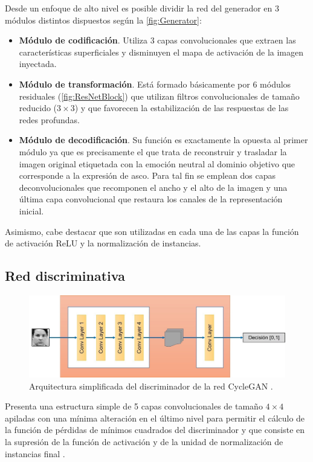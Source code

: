 Desde un enfoque de alto nivel es posible dividir la red del generador en 3 módulos distintos dispuestos según la \autoref{fig:Generator}:
\begin{itemize}
    \item \textbf{Módulo de codificación}. Utiliza 3 capas convolucionales que extraen las características superficiales y disminuyen el mapa de activación de la imagen inyectada.
    \item \textbf{Módulo de transformación}. Está formado básicamente por 6 módulos residuales (\autoref{fig:ResNetBlock}) que utilizan filtros convolucionales de tamaño reducido ($3\times 3$) y que favorecen la estabilización de las respuestas de las redes profundas.
    \item \textbf{Módulo de decodificación}. Su función es exactamente la opuesta al primer módulo ya que es precisamente el que trata de reconstruir y trasladar la imagen original etiquetada con la emoción neutral al dominio objetivo que corresponde a la expresión de asco. Para tal fin se emplean dos capas deconvolucionales que recomponen el ancho y el alto de la imagen y una última capa convolucional que restaura los canales de la representación inicial.
\end{itemize}

Asimismo, cabe destacar que son utilizadas en cada una de las capas la función de activación ReLU y la normalización de instancias.

\subsection{Red discriminativa}

\begin{figure}
  \centering
  \includegraphics[width=\textwidth]{Images/Discriminator.png}
  \caption{Arquitectura simplificada del discriminador de la red CycleGAN \cite{img:CycleGAN}.}
  \label{fig:Discriminator}
\end{figure}

Presenta una estructura simple de 5 capas convolucionales de tamaño $4\times 4$ apiladas con una mínima alteración en el último nivel para permitir el cálculo de la función de pérdidas de mínimos cuadrados del discriminador y que consiste en la supresión de la función de activación y de la unidad de normalización de instancias final \cite{LSGAN}.

